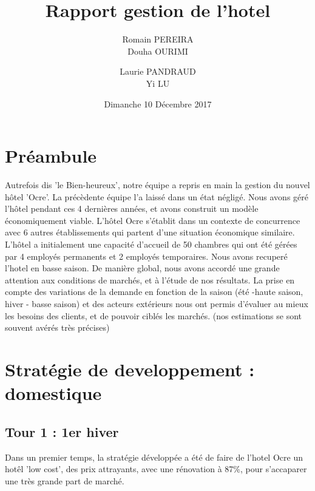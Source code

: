 \documentclass[a4paper,10pt]{article}
\title{Rapport gestion de l'hotel}
\author{
  Romain PEREIRA\\
  \newline
  Douha OURIMI\\
  \and
  Laurie PANDRAUD\\
  \newline
  Yi LU\\
}
\date{Dimanche 10 Décembre 2017}
\begin{document}
\maketitle
\tableofcontents
  \section{Préambule}
    Autrefois dis 'le Bien-heureux', notre équipe a repris en main la gestion du nouvel hôtel 'Ocre'. La précèdente équipe l'a laissé dans un état négligé.
    Nous avons géré l'hôtel pendant ces 4 dernières années, et avons construit un modèle économiquement viable.
    \newline
    \newline
    L’hôtel Ocre s’établit dans un contexte de concurrence avec 6 autres établissements qui partent d’une situation économique similaire.
    L’hôtel a initialement une capacité d’accueil de 50 chambres qui ont été gérées par 4 employés permanents et 2 employés temporaires.
    Nous avons recuperé l'hotel en basse saison.
    \newline
    \newline
    De manière global, nous avons accordé une grande attention aux conditions de marchés, et à l'étude de nos résultats.
    La prise en compte des variations de la demande en fonction de la saison
    (été -haute saison, hiver - basse saison) et des acteurs extérieurs nous ont permis d’évaluer
    au mieux les besoins des clients, et de pouvoir ciblés les marchés. (nos estimations se sont souvent avérés très précises)
  \newpage
  \section{Stratégie de developpement : domestique}
    \subsection{Tour 1 : 1er hiver}      
      Dans un premier temps, la stratégie développée a été de faire de l’hotel Ocre un hotêl 'low cost',
      des prix attrayants, avec une rénovation à 87\%, pour s’accaparer une très grande part de marché.
      
      
\end{document}
